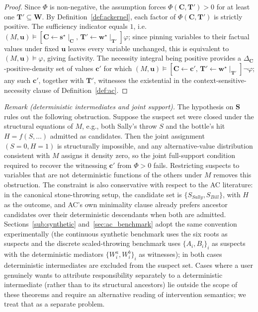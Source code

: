 \begin{proof}
Since $\Phi$ is non-negative, the assumption forces $\Phi(\mathbf{C},\mathbf{T}')>0$
for at least one $\mathbf{T}'\subseteq\mathbf{W}$. By Definition~\ref{def:ackernel},
each factor of $\Phi(\mathbf{C},\mathbf{T}')$ is strictly positive. The sufficiency
indicator equals $1$, i.e.\
$(M,\mathbf{u})\vDash[\mathbf{C}\!\leftarrow\!\mathbf{s}^\star\!\mid_{\mathbf{C}},\,\mathbf{T}'\!\leftarrow\!\mathbf{w}^\star\!\mid_{\mathbf{T}'}]\varphi$;
since pinning variables to their factual values under fixed $\mathbf{u}$ leaves every
variable unchanged, this is equivalent to $(M,\mathbf{u})\vDash\varphi$, giving
factivity. The necessity integral being positive provides a
$\Delta_{\mathbf{C}}$-positive-density set of values $\mathbf{c}'$ for which
$(M,\mathbf{u})\vDash[\mathbf{C}\!\leftarrow\!\mathbf{c}',\,\mathbf{T}'\!\leftarrow\!\mathbf{w}^\star\!\mid_{\mathbf{T}'}]\neg\varphi$;
any such $\mathbf{c}'$, together with $\mathbf{T}'$, witnesses the existential in the
context-sensitive-necessity clause of Definition~\ref{def:ac}.
\end{proof}

\medskip\noindent\textit{Remark (deterministic intermediates and joint support).}
The hypothesis on $\mathbf{S}$ rules out the following obstruction.
Suppose the suspect set were closed under the structural equations of $M$, e.g., both
Sally's throw $S$ and the bottle's hit $H = f(S,\ldots)$ admitted as candidates. Then the
joint assignment $(S{=}0, H{=}1)$ is structurally impossible, and any alternative-value
distribution consistent with $M$ assigns it density zero, so the joint full-support
condition required to recover the witnessing $\mathbf{c}'$ from $\Phi > 0$ fails.
Restricting suspects to variables that are not deterministic functions of the others
under $M$ removes this obstruction. The constraint is also conservative with respect to
the AC literature: in the canonical stone-throwing setup, the candidate set is
$\{S_{Sally}, S_{Bill}\}$, with $H$ as the outcome, and AC's own
minimality clause already prefers ancestor candidates over their deterministic descendants
when both are admitted. Sections~\ref{sub:synthetic} and~\ref{sec:ac_benchmark} adopt the
same convention experimentally (the continuous synthetic benchmark uses the six roots
as suspects and the discrete scaled-throwing benchmark uses $\{A_i,B_i\}_i$ as suspects
with the deterministic mediators $\{W^a_i,W^b_i\}_i$ as witnesses); in both cases
deterministic intermediates are excluded from the suspect set. Cases where a user genuinely wants to attribute responsibility separately to a
deterministic intermediate (rather than to its structural ancestors) lie outside the
scope of these theorems and require an alternative reading of intervention semantics; we
treat that as a separate problem.

